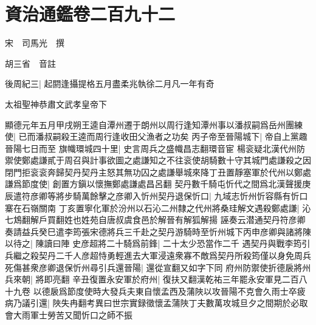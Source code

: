 \chapter{資治通鑑卷二百九十二}
宋　司馬光　撰

胡三省　音註

後周紀三|{
	起閼逢攝提格五月盡柔兆執徐二月凡一年有奇}


太祖聖神恭肅文武孝皇帝下

顯德元年五月甲戌朔王逵自潭州遷于朗州以周行逢知潭州事以潘叔嗣爲岳州團練使|{
	已而潘叔嗣殺王逵而周行逢收田父漁者之功矣}
丙子帝至晉陽城下|{
	帝自上黨趣晉陽七日而至}
旗幟環城四十里|{
	史言周兵之盛幟昌志翻環音宦}
楊衮疑北漢代州防禦使鄭處謙貳于周召與計事欲圖之處謙知之不往衮使胡騎數十守其城門處謙殺之因閉門拒衮衮奔歸契丹契丹主怒其無功囚之處謙舉城來降丁丑置靜塞軍於代州以鄭處謙爲節度使|{
	創置方鎭以懷撫鄭處謙處昌呂翻}
契丹數千騎屯忻代之間爲北漢聲援庚辰遣符彦卿等將步騎萬餘擊之彦卿入忻州契丹退保忻口|{
	九域志忻州忻容縣有忻口寨在石嶺關南}
丁亥置寧化軍於汾州以石沁二州隸之代州將桑珪解文遇殺鄭處謙|{
	沁七鴆翻解戶買翻姓也姓苑自唐叔虞食邑於解晉有解狐解揚}
誣奏云潜通契丹符彦卿奏請益兵癸巳遣李筠張宋德將兵三千赴之契丹游騎時至忻州城下丙申彦卿與諸將陳以待之|{
	陳讀曰陣}
史彦超將二十騎爲前鋒|{
	二十太少恐當作二千}
遇契丹與戰李筠引兵繼之殺契丹二千人彦超恃勇輕進去大軍浸遠衆寡不敵爲契丹所殺筠僅以身免周兵死傷甚衆彦卿退保忻州尋引兵還晉陽|{
	還從宣翻又如字下同}
府州防禦使折德扆將州兵來朝|{
	將即亮翻}
辛丑復置永安軍於府州|{
	復扶又翻漢乾祐三年罷永安軍見二百八十九卷}
以德扆爲節度使時大發兵夫東自懷孟西及蒲陜以攻晉陽不克會久雨士卒疲病乃議引還|{
	陜失冉翻考異曰世宗實録徵懷孟蒲陜丁夫數萬攻城旦夕之間期於必取會大雨軍士勞苦又聞忻口之師不振}


